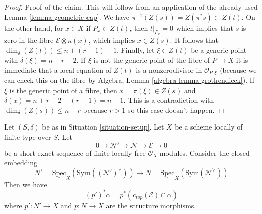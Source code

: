 \begin{proof}
\medskip\noindent
Proof of the claim. This will follow from an application of
the already used Lemma \ref{lemma-geometric-cap}.
We have $\pi^{-1}(Z(s)) = Z(\pi^*s) \subset Z(t)$.
On the other hand, for $x \in X$ if $P_x \subset Z(t)$, then
$t|_{P_x} = 0$ which implies that $s$ is zero in the fibre
$\mathcal{E} \otimes \kappa(x)$, which implies $x \in Z(s)$.
It follows that $\dim_\delta(Z(t)) \leq n + (r - 1) - 1$.
Finally, let $\xi \in Z(t)$ be a generic point with
$\delta(\xi) = n + r - 2$. If $\xi$ is not the generic point
of the fibre of $P \to X$ it is immediate that
a local equation of $Z(t)$ is a nonzerodivisor in $\mathcal{O}_{P, \xi}$
(because we can check this on the fibre by
Algebra, Lemma \ref{algebra-lemma-grothendieck}).
If $\xi$ is the generic point of a fibre, then $x = \pi(\xi) \in Z(s)$
and $\delta(x) = n + r - 2 - (r - 1) = n - 1$. This is a contradiction
with $\dim_\delta(Z(s)) \leq n - r$ because $r > 1$
so this case doesn't happen.
\end{proof}

\begin{lemma}
\label{lemma-easy-virtual-class}
Let $(S, \delta)$ be as in Situation \ref{situation-setup}. Let $X$
be a scheme locally of finite type over $S$. Let
$$
0 \to \mathcal{N}' \to \mathcal{N} \to \mathcal{E} \to 0
$$
be a short exact sequence of finite locally free $\mathcal{O}_X$-modules.
Consider the closed embedding
$$
N' = \underline{\text{Spec}}_X(\text{Sym}((\mathcal{N}')^\vee))
\longrightarrow
N = \underline{\text{Spec}}_X(\text{Sym}(\mathcal{N}^\vee))
$$
Then we have
$$
(p')^*\alpha = p^*(c_{top}(\mathcal{E}) \cap \alpha)
$$
where $p' : N' \to X$ and $p : N \to X$ are the structure morphisms.
\end{lemma}

